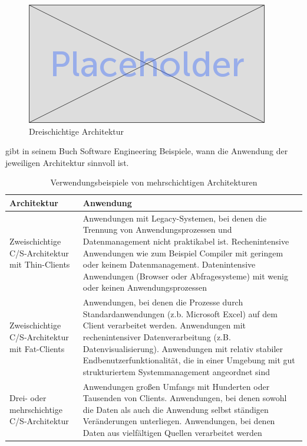 	\begin{figure}[h]
		\centering
		\includegraphics[width=0.5\linewidth]{images/placeholder}
		\caption{Dreischichtige Architektur}
		\label{fig:3-tier-architecture}
	\end{figure}


	\citet*{Sommerville.2007} gibt in seinem Buch Software Engineering Beispiele, wann die Anwendung der jeweiligen Architektur sinnvoll ist.
	
	\begin{table}[h]
	\begin{tabular}{|p{3.5cm}|p{12.5cm}|}
		\hline 
		\textbf{Architektur} & \textbf{Anwendung} \\ 
		\hline 
		Zweischichtige C/S-Architektur mit Thin-Clients & Anwendungen mit Legacy-Systemen, bei denen die Trennung von Anwendungsprozessen und Datenmanagement nicht praktikabel ist. Rechenintensive Anwendungen wie zum Beispiel Compiler mit geringem oder keinem Datenmanagement. Datenintensive Anwendungen (Browser oder Abfragesysteme) mit wenig oder keinen Anwendungsprozessen \\
		\hline 
		Zweischichtige C/S-Architektur mit Fat-Clients & Anwendungen, bei denen die Prozesse durch Standardanwendungen (z.b. Microsoft Excel) auf dem Client verarbeitet werden. Anwendungen mit rechenintensiver Datenverarbeitung (z.B. Datenvisualisierung). Anwendungen mit relativ stabiler Endbenutzerfunktionalität, die in einer Umgebung mit gut strukturiertem Systemmanagement angeordnet sind \\ 
		\hline 
		Drei- oder mehrschichtige C/S-Architektur & Anwendungen großen Umfangs mit Hunderten oder Tausenden von Clients. Anwendungen, bei denen sowohl die Daten als auch die Anwendung selbst ständigen Veränderungen unterliegen. Anwendungen, bei denen Daten aus vielfältigen Quellen verarbeitet werden \\ 
		\hline 
	\end{tabular} 
			\caption{Verwendungsbeispiele von mehrschichtigen Architekturen \cite{Sommerville.2007}}
	\end{table}
	
	
